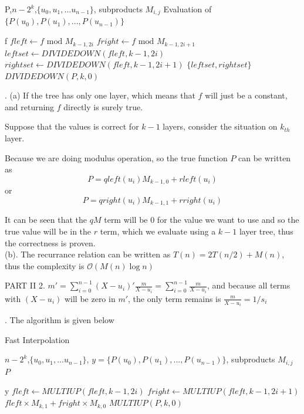 \documentclass{article}
\begin{document}
{\begin{algorithm}[H]
\begin{algorithmic}[1]
        \Require P,$n-2^k$,$\{u_0,u_1,...u_{n-1}\}$, subproducts $M_{i,j}$
        \Ensure Evaluation of $\{P(u_0),P(u_1),...,P(u_{n-1})\}$

                \State \Return f
            \EndIf
            \State $fleft \gets f \text{ mod } M_{k-1,2i}$
            \State $fright \gets f \text{ mod } M_{k-1,2i+1}$
            \State $leftset \gets DIVIDEDOWN(fleft,k-1,2i)$
            \State $rightset \gets DIVIDEDOWN(fleft,k-1,2i+1)$
            \State \Return $\{leftset,rightset\}$
        \EndFunction
        \State \Return $DIVIDEDOWN(P,k,0)$
    \end{algorithmic}  
\end{algorithm}

{. (a) If the tree has only one layer, which means that $f$ will just be a constant, and returning $f$ directly is surely true.}

Suppose that the values is correct for $k-1$ layers, consider the situation on $k_{th}$ layer.

Because we are doing modulus operation, so the true function $P$ can be written as $$P = qleft(u_i)M_{k-1,0}+rleft(u_i)$$ or $$P = qright(u_i)M_{k-1,1}+rright(u_i)$$

It can be seen that the $qM$ term will be $0$ for the value we want to use and so the true value will be in the $r$ term, which we evaluate using a $k-1$ layer tree, thus the correctness is proven.\\

{\noindent (b). The recurrance relation can be written as $T(n)=2T(n/2)+M(n)$, thus the complexity is $\mathcal{O}(M(n)\log{n})$\\}

{\noindent PART II 2. $m' = \sum_{i=0}^{n-1}(X-u_i)'\frac{m}{X-u_i} = \sum_{i=0}^{n-1}\frac{m}{X-u_i}$, and because all terms with $(X-u_i)$ will be zero in $m'$, the only term remains is $\frac{m}{X-u_i} = 1/s_i$}

{. The algorithm is given below}

\begin{algorithm}[H]
    \caption{Fast Interpolation}  
    \begin{algorithmic}[1] 

        \Require $n-2^k$,$\{u_0,u_1,...u_{n-1}\}$, $y = \{P(u_0),P(u_1),...,P(u_{n-1})\}$, subproducts $M_{i,j}$
        \Ensure $P$

                \State \Return y
            \EndIf
            \State $fleft \gets MULTIUP(fleft,k-1,2i)$
            \State $fright \gets MULTIUP(fleft,k-1,2i+1)$
            \State \Return $fleft\times M_{k,1}+fright\times M_{k,0}$
        \EndFunction
        \State \Return $MULTIUP(P,k,0)$
    \end{algorithmic}  
\end{algorithm}

}
\end{document}
